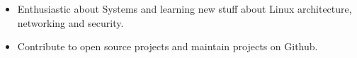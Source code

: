 



{\fontsize{11pt}{1em}\bodyfontlight\upshape\color{text}
\begin{itemize}
  \itemsep-0.3em
  \item Enthusiastic about Systems and learning new stuff about Linux architecture, networking and security.
  \item Contribute to open source projects and maintain projects on Github.
\end{itemize}
}
